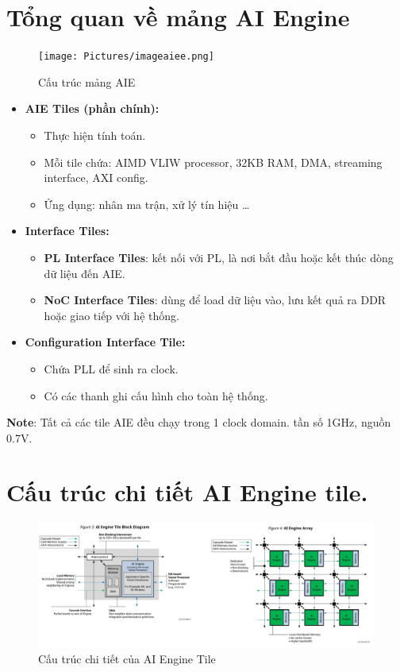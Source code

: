 \section{Tổng quan về mảng AI Engine}
\begin{figure}[H]
    \centering
    \texttt{[image: Pictures/imageaiee.png]}
    \caption{Cấu trúc mảng AIE}
\end{figure}

\begin{itemize}
    \item \textbf{AIE Tiles (phần chính):}
    \begin{itemize}
        \item Thực hiện tính toán.
        \item Mỗi tile chứa: AIMD VLIW processor, 32KB RAM, DMA, streaming interface, AXI config.
        \item Ứng dụng: nhân ma trận, xử lý tín hiệu \ldots
    \end{itemize}

    \item \textbf{Interface Tiles:}
    \begin{itemize}
        \item \textbf{PL Interface Tiles}: kết nối với PL, là nơi bắt đầu hoặc kết thúc dòng dữ liệu đến AIE.
        \item \textbf{NoC Interface Tiles}: dùng để load dữ liệu vào, lưu kết quả ra DDR hoặc giao tiếp với hệ thống.
    \end{itemize}

    \item \textbf{Configuration Interface Tile:}
    \begin{itemize}
        \item Chứa PLL để sinh ra clock.
        \item Có các thanh ghi cấu hình cho toàn hệ thống.
    \end{itemize}

    
\end{itemize}
\textbf{Note}: Tất cả các tile AIE đều chạy trong 1 clock domain. tần số 1GHz, nguồn 0.7V.
\section{Cấu trúc chi tiết AI Engine tile.}
\begin{figure}[H]
    \centering
    \includegraphics[width=1\linewidth]{archie.png}
    \caption{Cấu trúc chi tiết của AI Engine Tile}
\end{figure}

